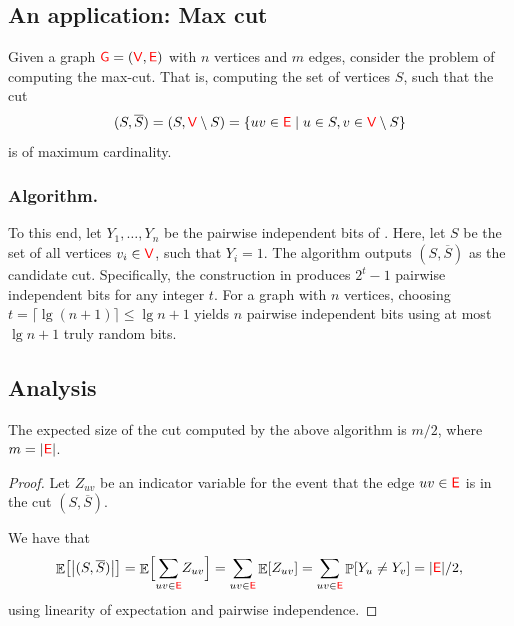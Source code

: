 \subsection{An application: Max cut}

Given a graph ${\textcolor{red}{\mathsf{G}}} = ({\textcolor{red}{\mathsf{V}}}, {\textcolor{red}{\mathsf{E}}})$ with $n$ vertices and $m$
edges, consider the problem of computing the max-cut. That is,
computing the set of vertices $S$, such that the cut
\begin{equation*}
    (S, \overline{S})%
    =%
    (S, \Vertices\setminus S) =%
    \Set{uv \in \Edges}{ u \in S, v \in \Vertices \setminus S}
\end{equation*}
is of maximum cardinality.

\subsubsection{Algorithm.}
To this end, let $Y_1, \ldots, Y_n$ be the pairwise independent bits of
. Here, let $S$ be the set of all vertices
$v_i \in {\textcolor{red}{\mathsf{V}}}$, such that $Y_i= 1$. The algorithm outputs
$(S, \overline{S})$ as the candidate cut.  Specifically, the construction
in  produces $2^t - 1$ pairwise independent bits for any
integer $t$. For a graph with $n$ vertices, choosing
$t = \lceil \lg(n+1) \rceil \leq \lg n + 1$ yields $n$ pairwise independent bits using
at most $\lg n + 1$ truly random bits.

\subsection{Analysis}

\begin{lemma}
    The expected size of the cut computed by the above algorithm is
    $m/2$, where $m = |{\textcolor{red}{\mathsf{E}}}|$.
\end{lemma}
\begin{proof}
    Let $Z_{uv}$ be an indicator variable for the event that the edge
    $uv \in {\textcolor{red}{\mathsf{E}}}$ is in the cut $(S,\overline{S})$.

    We have that
    \begin{equation*}
        \Ex{ \bigl|  ( S, \overline{S} ) \bigr| } %
        =%
        \Ex{\Bigl. \smash{\sum_{uv \in\Edges}} Z_{uv}}%
        =%
        \sum_{uv \in\Edges} \Ex{Z_{uv}}%
        =%
        \sum_{uv \in\Edges} \Prob{Y_u \neq Y_v}%
        =%
        |\Edges|/2,
    \end{equation*}
    using linearity of expectation and pairwise independence.
\end{proof}


